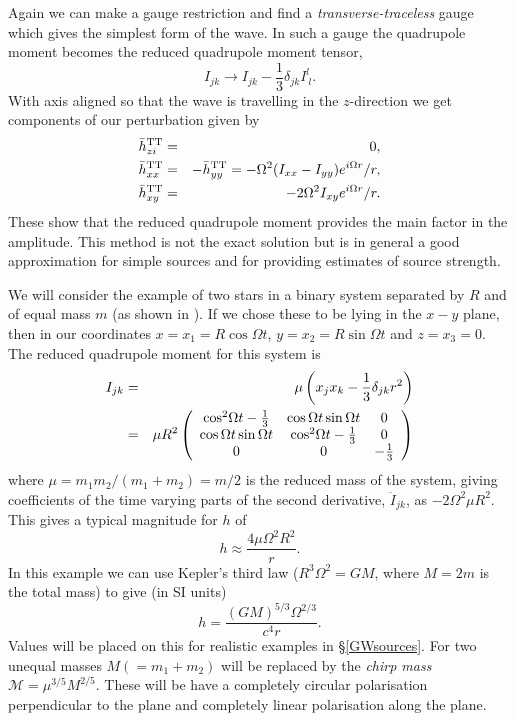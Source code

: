 Again we can make a gauge restriction and find a {\it transverse-traceless} gauge which gives the
simplest form of the wave. In such a gauge the quadrupole moment becomes the reduced quadrupole
moment tensor,
\begin{equation}
I_{jk} \to I_{jk} - \frac{1}{3}\delta_{jk}I^l_{~l}.
\end{equation}
With axis aligned so that the wave is travelling in the $z$-direction we get components of our
perturbation given by
\begin{eqnarray}
\bar{h}^{\rm TT}_{zi} & = & 0, \\
\bar{h}^{\rm TT}_{xx} & = & -\bar{h}^{\rm TT}_{yy} = -\Omega^2(I_{xx} - I_{yy})e^{i\Omega{}r}/r, \\
\bar{h}^{\rm TT}_{xy} & = & -2\Omega^2I_{xy}e^{i\Omega{}r}/r.
\end{eqnarray}
These show that the reduced quadrupole moment provides the main factor in the \gw amplitude. This
method is not the exact solution but is in general a good approximation for simple sources and for
providing estimates of source strength.

We will consider the example of two stars in a binary system separated by $R$ and of equal mass
$m$ (as shown in \cite{Flanagan:2005}). If we chose these to be lying in the $x-y$ plane, then in
our coordinates $x = x_1 = R\cos{\Omega{}t}$, $y = x_2 = R\sin{\Omega{}t}$ and $z = x_3 = 0$. The
reduced quadrupole moment for this system is
\begin{eqnarray}
I_{jk} & = & \mu\left(x_jx_k - \frac{1}{3}\delta_{jk}r^2\right) \\
 & = & \mu{}R^2\left( \begin{array}{ccc}
 {\rm cos}^2\Omega{}t - \frac{1}{3} & \cos{\Omega{}t}\sin{\Omega{}t} & 0 \\
 \cos{\Omega{}t}\sin{\Omega{}t} & {\rm cos}^2\Omega{}t - \frac{1}{3} & 0 \\
 0 & 0 & -\frac{1}{3} \end{array}\right)
\end{eqnarray}
where $\mu = m_1m_2/(m_1 + m_2) = m/2$ is the reduced mass of the system, giving coefficients of the
time varying parts of the second derivative, $\ddot{I}_{jk}$, as $-2\Omega^2\mu{}R^2$. This gives a
typical magnitude for $h$ of
\begin{equation}
h \approx \frac{4\mu\Omega^2R^2}{r}.
\end{equation}
In this example we can use Kepler's third law ($R^3\Omega^2 = GM$, where $M = 2m$ is the total mass)
to give (in SI units)
\begin{equation}\label{binaryamp}
h = \frac{(GM)^{5/3}\Omega^{2/3}}{c^4r}.
\end{equation}
Values will be placed on this for realistic examples in \S\ref{GWsources}. For two unequal masses
$M (=m_1+m_2)$ will be replaced by the {\it chirp mass} $\mathcal{M} = \mu^{3/5}M^{2/5}$. These \gws
will be have a completely circular polarisation perpendicular to the plane and completely linear
polarisation along the plane.

